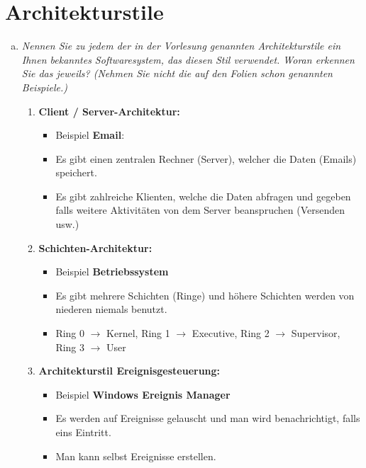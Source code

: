 \section{Architekturstile}
\begin{enumerate}[(a)]
    \item {\itshape Nennen Sie zu jedem der in der Vorlesung genannten Architekturstile ein Ihnen bekanntes Softwaresystem, das diesen Stil verwendet. Woran erkennen Sie das jeweils? (Nehmen Sie nicht die auf den Folien schon genannten Beispiele.)}
    \begin{enumerate}[1.]
        \item \textbf{Client / Server-Architektur:}
        \begin{itemize}
            \item Beispiel \textbf{Email}:
            \item Es gibt einen zentralen Rechner (Server), welcher die Daten (Emails) speichert.
            \item Es gibt zahlreiche Klienten, welche die Daten abfragen und gegeben falls weitere Aktivitäten von dem Server beanspruchen (Versenden usw.)
        \end{itemize}
        
        \item \textbf{Schichten-Architektur:}
        \begin{itemize}
            \item Beispiel \textbf{Betriebssystem}
            \item Es gibt mehrere Schichten (Ringe) und höhere Schichten werden von niederen niemals benutzt.
            \item Ring 0 $\xrightarrow{}$ Kernel, Ring 1 $\xrightarrow{}$ Executive, Ring 2 $\xrightarrow{}$ Supervisor, Ring 3 $\xrightarrow{}$ User
        \end{itemize}
        
        \item \textbf{Architekturstil Ereignisgesteuerung:}
        \begin{itemize}
            \item Beispiel \textbf{Windows Ereignis Manager}
            \item Es werden auf Ereignisse gelauscht und man wird benachrichtigt, falls eins Eintritt.
            \item Man kann selbst Ereignisse erstellen.
        \end{itemize}
        

\end{enumerate}
\end{enumerate}
